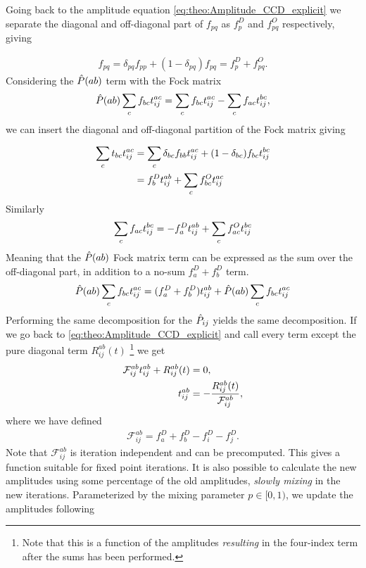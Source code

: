 Going back to the amplitude equation \cref{eq:theo:Amplitude_CCD_explicit} we separate the diagonal and off-diagonal part of $f_{pq}$ as $f_{p}^D$ and $f_{pq}^O$ respectively, giving

\begin{align*}
    f_{pq} = \delta_{pq} f_{pp} + (1-\delta_{pq})f_{pq} = f_{p}^D + f_{pq}^O.
\end{align*}
Considering the $\hat{P}(ab)$ term with the Fock matrix
\begin{align*}
    \hat{P}(ab) \sum_{c} f_{bc} t^{ac}_{ij} = \sum_{c} f_{bc}t^{ac}_{ij} - \sum_{c}f_{ac}t^{bc}_{ij},
\end{align*}
we can insert the diagonal and off-diagonal partition of the Fock matrix giving

\begin{align*}
    \sum_{c} t_{bc} t^{ac}_{ij} &= \sum_{c} \delta_{bc}f_{bb}t^{ac}_{ij} + (1-\delta_{bc})f_{bc}t^{bc}_{ij} \\
    &= f_{b}^D t^{ab}_{ij} + \sum_{c}f_{bc}^O t^{ac}_{ij}
\end{align*}
Similarly 
\begin{align*}
    \sum_{c} f_{ac}t^{bc}_{ij} = -f_a^D t^{ab}_{ij} + \sum_{c} f_{ac}^O t^{bc}_{ij}
\end{align*}
Meaning that the $\hat{P}(ab)$ Fock matrix term can be expressed as the sum over the off-diagonal part, in addition to a no-sum $f_a^D + f_b^D$ term.
\begin{align*}
    \hat{P}(ab) \sum_{c} f_{bc}t^{ac}_{ij} = (f_a^D + f_b^D)t^{ab}_{ij} + \hat{P}(ab) \sum_{c} f_{bc}t^{ac}_{ij}
\end{align*}
Performing the same decomposition for the $\hat{P}_{ij}$ yields the same decomposition. If we go back to \cref{eq:theo:Amplitude_CCD_explicit} and call every term except the pure diagonal term $R^{ab}_{ij}(t)$ \footnote{Note that this is a function of the amplitudes \textit{resulting} in the four-index term after the sums has been performed.} we get 
\begin{align*}
    \mathcal{F}^{ab}_{ij}t^{ab}_{ij} + R^{ab}_{ij}(t) &= 0, \\ 
    t^{ab}_{ij} &= -\frac{R^{ab}_{ij}(t)}{\mathcal{F}^{ab}_{ij}},
\end{align*}
where we have defined 
\begin{align*}
    \mathcal{F}^{ab}_{ij} = f_a^D + f_b^D -f_i^D - f_j^D.
\end{align*}
Note that $\mathcal{F}^{ab}_{ij}$ is iteration independent and can be precomputed. This gives a function suitable for fixed point iterations. It is also possible to calculate the new amplitudes using some percentage of the old amplitudes, \textit{slowly mixing} in the new iterations. Parameterized by the mixing parameter $p \in [0,1)$, we update the amplitudes following  

